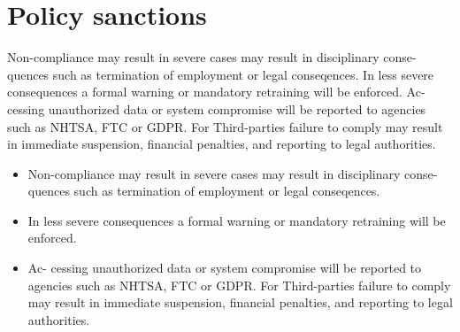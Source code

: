 \section{Policy sanctions}

Non-compliance may result in severe cases may result in disciplinary conse-
quences such as termination of employment or legal conseqences. In less severe
consequences a formal warning or mandatory retraining will be enforced. Ac-
cessing unauthorized data or system compromise will be reported to agencies
such as NHTSA, FTC or GDPR. For Third-parties failure to comply may result
in immediate suspension, financial penalties, and reporting to legal authorities.

\begin{itemize}
    \item Non-compliance may result in severe cases may result in disciplinary conse-
quences such as termination of employment or legal conseqences. 
    \item In less severe
consequences a formal warning or mandatory retraining will be enforced. 
    \item Ac-
cessing unauthorized data or system compromise will be reported to agencies
such as NHTSA, FTC or GDPR. For Third-parties failure to comply may result
in immediate suspension, financial penalties, and reporting to legal authorities.

\end{itemize}
   

